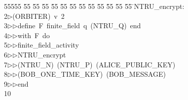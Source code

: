 %
%
\begin{tabbing}
55555 \= 55 \= 55 \= 55 \= 55 \= 55 \= 55 \= 55 \= 55 \= 55 \= 55 \= 55 \= 55 \= \>NTRU\_encrypt:\\[0pt]
2\>$\triangleright$\>(ORBITER)\ v\ 2\ \\[0pt]
3\>$\triangleright$\>$\triangleright$\>define\ F\ finite\_field\ q\ (NTRU\_Q)\ end\ \\[0pt]
4\>$\triangleright$\>$\triangleright$\>with\ F\ do\ \\[0pt]
5\>$\triangleright$\>$\triangleright$\>finite\_field\_activity\ \\[0pt]
6\>$\triangleright$\>$\triangleright$\>NTRU\_encrypt\ \\[0pt]
7\>$\triangleright$\>$\triangleright$\>(NTRU\_N)\ (NTRU\_P)\ (ALICE\_PUBLIC\_KEY)\ \\[0pt]
8\>$\triangleright$\>$\triangleright$\>(BOB\_ONE\_TIME\_KEY)\ (BOB\_MESSAGE)\ \\[0pt]
9\>$\triangleright$\>$\triangleright$\>end\\[0pt]
10\>\end{tabbing}
